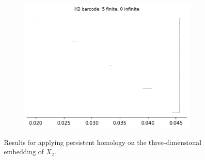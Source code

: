\begin{figure}[H]
\begin{subfigure}[b]{0.24\textwidth}
\includegraphics[width=\textwidth]{figures/X2_H2_barcode.png}
 \caption{}
\end{subfigure}
\caption{Results for applying persistent homology on the three-dimensional embedding of $X_2$.}
\end{figure}

